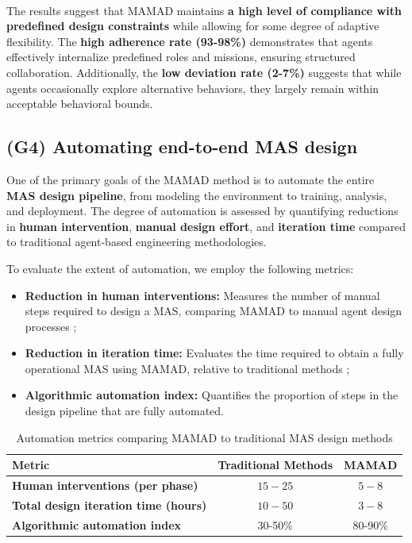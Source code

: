 \documentclass[pdflatex,sn-mathphys-num]{sn-jnl}%
\theoremstyle{thmstyleone}%
\theoremstyle{thmstyletwo}%
\theoremstyle{thmstylethree}%
\begin{document}
\

The results suggest that MAMAD maintains \textbf{a high level of compliance with predefined design constraints} while allowing for some degree of adaptive flexibility. The \textbf{high adherence rate (93-98\%)} demonstrates that agents effectively internalize predefined roles and missions, ensuring structured collaboration. Additionally, the \textbf{low deviation rate (2-7\%)} suggests that while agents occasionally explore alternative behaviors, they largely remain within acceptable behavioral bounds.

\subsection{(G4) Automating end-to-end MAS design}

One of the primary goals of the MAMAD method is to automate the entire \textbf{MAS design pipeline}, from modeling the environment to training, analysis, and deployment. The degree of automation is assessed by quantifying reductions in \textbf{human intervention}, \textbf{manual design effort}, and \textbf{iteration time} compared to traditional agent-based engineering methodologies.

To evaluate the extent of automation, we employ the following metrics:

\begin{itemize}
    \item \textbf{Reduction in human interventions:} Measures the number of manual steps required to design a MAS, comparing MAMAD to manual agent design processes ;
    \item \textbf{Reduction in iteration time:} Evaluates the time required to obtain a fully operational MAS using MAMAD, relative to traditional methods ;
    \item \textbf{Algorithmic automation index:} Quantifies the proportion of steps in the design pipeline that are fully automated.
\end{itemize}

\begin{table}[h!]
    \centering
    \caption{Automation metrics comparing MAMAD to traditional MAS design methods}
    \begin{tabular}{|l|c|c|}
        \hline
        \textbf{Metric}                              & \textbf{Traditional Methods} & \textbf{MAMAD} \\
        \hline
        \textbf{Human interventions (per phase)}     & $15 - 25$                    & $5 - 8$        \\
        \hline
        \textbf{Total design iteration time (hours)} & $10 - 50$                    & $3 - 8$        \\
        \hline
        \textbf{Algorithmic automation index}        & 30-50\%                      & 80-90\%        \\
        \hline
    \end{tabular}
    \label{tab:automation}
\end{table}
\end{document}
